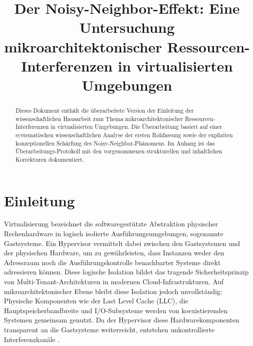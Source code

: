 \documentclass[conference]{IEEEtran}
\begin{document}
\title{Der Noisy-Neighbor-Effekt: Eine Untersuchung mikroarchitektonischer Ressourcen-Interferenzen in virtualisierten Umgebungen}

\author{%
}

\maketitle

\begin{abstract}
Dieses Dokument enthält die überarbeitete Version der Einleitung der
wissenschaftlichen Hausarbeit zum Thema mikroarchitektonischer
Ressourcen-Interferenzen in virtualisierten Umgebungen. Die Überarbeitung
basiert auf einer systematischen wissenschaftlichen Analyse der ersten
Rohfassung sowie der expliziten konzeptionellen Schärfung des
Noisy-Neighbor-Phänomens. Im Anhang ist das Überarbeitungs-Protokoll mit den
vorgenommenen strukturellen und inhaltlichen Korrekturen dokumentiert.
\end{abstract}

\section{Einleitung}

Virtualisierung bezeichnet die softwaregestützte Abstraktion physischer
Rechenhardware in logisch isolierte Ausführungsumgebungen, sogenannte
Gastsysteme. Ein Hypervisor vermittelt dabei zwischen den Gastsystemen
und der physischen Hardware, um zu gewährleisten, dass Instanzen weder
den Adressraum noch die Ausführungskontrolle benachbarter Systeme direkt
adressieren können. Diese logische Isolation bildet das tragende
Sicherheitsprinzip von Multi-Tenant-Architekturen in modernen
Cloud-Infrastrukturen. Auf mikroarchitektonischer Ebene bleibt diese
Isolation jedoch unvollständig: Physische Komponenten wie der Last Level
Cache (LLC), die Hauptspeicherbandbreite und I/O-Subsysteme werden von
koexistierenden Systemen gemeinsam genutzt. Da der Hypervisor diese
Hardwarekomponenten transparent an die Gastsysteme weiterreicht,
entstehen unkontrollierte Interferenzkanäle \cite{koh2007analysis}.
\end{document}
